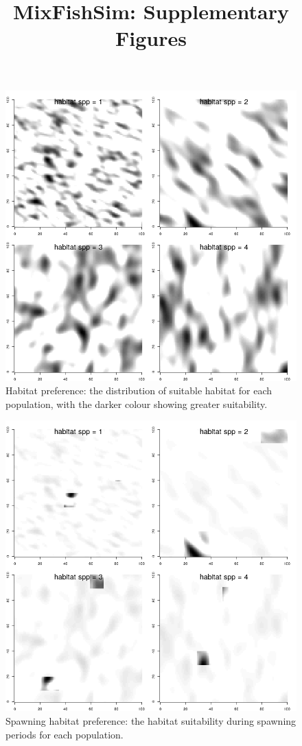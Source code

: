 \documentclass[review]{elsarticle}
\title{MixFishSim: Supplementary Figures}
\newcommand{\beginsupplement}{%
		        \setcounter{table}{0}
		        \renewcommand{\thetable}{S\arabic{table}}%
		        \setcounter{figure}{0}
		        \renewcommand{\thefigure}{S\arabic{figure}}%
			     }
\begin{document}
\beginsupplement
\maketitle

\begin{figure}[!ht]
	\includegraphics[width = \linewidth]{../analysis/habitat}
	\caption{Habitat preference: the distribution of suitable habitat for
		each population, with the darker colour showing greater
		suitability.}
	\label{fig:1}
\end{figure}	

\begin{figure}[!ht]
	\includegraphics[width = \linewidth]{../analysis/habitat_spwn}
	\caption{Spawning habitat preference: the habitat suitability during
		spawning periods for each population.}
	\label{fig:2}
\end{figure}	
\end{document}
